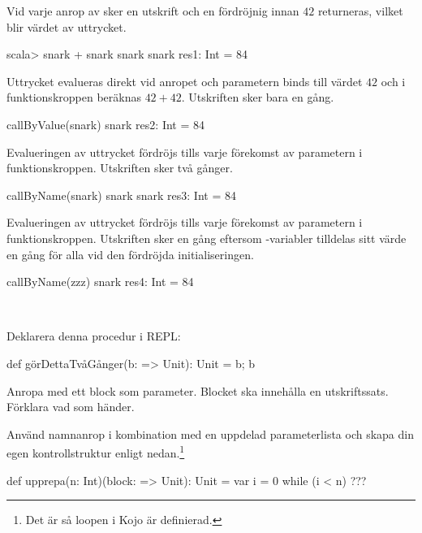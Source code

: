 \Subtask {}

\Subtask {}

\Subtask {}

\Subtask {}
\SOLUTION

\TaskSolved \what

\SubtaskSolved Vid varje anrop av  sker en utskrift och en fördröjnig innan $42$ returneras,  vilket blir värdet av uttrycket.
\begin{REPL}
scala> snark + snark
snark snark res1: Int = 84
\end{REPL}

\SubtaskSolved Uttrycket  evalueras direkt vid anropet och parametern  binds till värdet $42$ och i funktionskroppen beräknas $42+42$. Utskriften sker bara en gång.
\begin{REPL}
callByValue(snark)
snark res2: Int = 84
\end{REPL}

\SubtaskSolved Evalueringen av uttrycket  fördröjs tills varje förekomst av parametern  i funktionskroppen. Utskriften sker två gånger.
\begin{REPL}
callByName(snark)
snark snark res3: Int = 84
\end{REPL}

\SubtaskSolved Evalueringen av uttrycket  fördröjs tills varje förekomst av parametern  i funktionskroppen. Utskriften sker en gång eftersom -variabler tilldelas sitt värde en gång för alla vid den fördröjda initialiseringen.
\begin{REPL}
callByName(zzz)
snark res4: Int = 84
\end{REPL}

\QUESTEND





\QUESTBEGIN

\Task  \what~

\Subtask Deklarera denna procedur i REPL:
\begin{Code}
def görDettaTvåGånger(b: => Unit): Unit = { b; b }
\end{Code}

\Subtask Anropa  med ett block som parameter. Blocket ska innehålla en utskriftssats. Förklara vad som händer.

\Subtask Använd namnanrop i kombination med en uppdelad parameterlista och skapa din egen kontrollstruktur enligt nedan.\footnote{Det är så loopen  i Kojo är definierad.}
\begin{Code}
def upprepa(n: Int)(block: => Unit): Unit = {
   var i = 0
   while (i < n) { ??? }
}
\end{Code}

